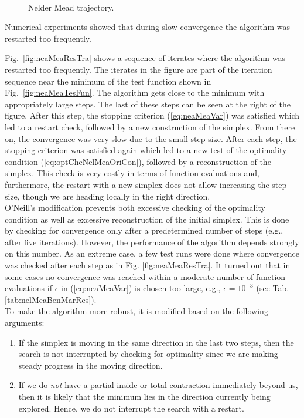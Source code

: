 \begin{figure}
  \mbox{  \quad
{} }
\caption{Nelder Mead trajectory.}
\end{figure}
Numerical experiments showed that during slow convergence the algorithm was restarted too frequently.

Fig.~\ref{fig:neaMeaResTra} shows a sequence of iterates where the algorithm was restarted too frequently.
The iterates in the figure are part of the iteration sequence near the
minimum of the test function shown in Fig.~\ref{fig:neaMeaTesFun}. 
The algorithm gets close to the minimum with appropriately large steps.
The last of these steps can be seen at the right of the figure.
After this step, the stopping criterion (\ref{eq:neaMeaVar}) was satisfied 
which led to a restart check, followed by a new construction of the simplex. From there on, the 
convergence was very slow due to the small step size. After each step, the stopping criterion was satisfied 
again which led to a new test of the optimality condition (\ref{eq:optCheNelMeaOriCon}), followed by a 
reconstruction of the simplex. This check is very costly in terms of function evaluations and, furthermore, 
the restart with a new simplex does not allow increasing the step size, though we are heading locally in 
the right direction.\\

O'Neill's modification prevents both excessive checking of the optimality condition as well as excessive 
reconstruction of the initial simplex. This is done by checking for convergence only after a predetermined 
number of steps (e.g., after five iterations). 
However, the performance of the algorithm depends 
strongly on this number. As an extreme case, a few test runs were done where convergence was checked 
after each step as in Fig. \ref{fig:neaMeaResTra}. It turned out that in some cases no convergence was 
reached within a moderate number of function evaluations if $\epsilon$ in (\ref{eq:neaMeaVar}) is chosen 
too large, e.g., $\epsilon = 10^{-3}$ (see Tab. \ref{tab:nelMeaBenMarRes}).\\

\pagebreak[2]
To make the algorithm more robust, it is modified based on the following arguments:
\begin{enumerate}
\item
If the simplex is moving in the same direction in the last two steps, then the search is not 
interrupted by checking for optimality since we are making steady progress in the moving direction.
\item
If we do \emph{not} have a partial inside or total contraction immediately beyond us, then it is likely 
that the minimum lies in the direction currently being explored. 
Hence, we do not interrupt the search with a restart.
\end{enumerate}

